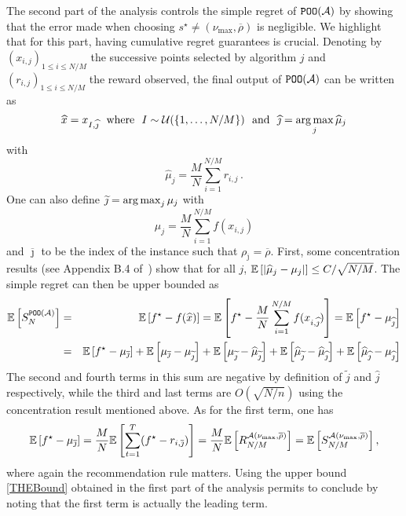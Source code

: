 The second part of the analysis controls the simple regret of $\texttt{POO}(\mathcal{A})$ by showing that the error made when choosing $s^\star \neq (\nu_{\max},\overline{\rho})$ is negligible. We highlight that for this part, having cumulative regret guarantees is crucial. Denoting by $(x_{i,j})_{1\leq i \leq N/M}$ the successive points selected by algorithm $j$ and $(r_{i,j})_{1\leq i \leq N/M}$ the reward observed, the final output of $\texttt{POO}(\mathcal{A})$ can be written as 
\[
    \widehat{x} = x_{I,\widehat\jmath} \ \ \text{where} \ \ I \sim \mathcal{U}(\{1,\dots,N/M\}) \  \text{ and} \ \ \widehat\jmath = \operatorname*{arg\,max}_{j} \widehat{\mu}_j
\] 
with 
\[
    \hat{\mu}_j = \frac{M}{N}\sum_{i=1}^{N/M} r_{i,j}\,.
\]
One can also define $\widetilde\jmath = \operatorname*{arg\,max}_{j} \mu_j$ with 
\[
    \mu_j =\frac{M}{N}\sum_{i=1}^{N/M} f(x_{i,j})
\]
and $\overline{\jmath}$ to be the index of the instance such that $\rho_{\overline{\jmath}} = \overline{\rho}$. First, some concentration results (see Appendix B.4 of~\citealt{grill2015poo}) show that for all $j$, $\mathbb{E}\left[|\widehat{\mu}_{j} - \mu_j|\right] \leq C/\sqrt{N/M}$. The simple regret can then be upper bounded as 
\begin{eqnarray*}
 \mathbb{E}\left[S_N^{\texttt{POO}(\mathcal{A})}\right] & = & \mathbb{E}\left[f^\star - f(\widehat{x})\right] = \mathbb{E}\left[f^\star - \frac{M}{N}\sum_{i=1}^{N/M}f(x_{i,\widehat{\jmath}})\right] = \mathbb{E}\left[f^\star - \mu_{\widehat\jmath}\right]\\
 & = & \mathbb{E}\left[f^\star - \mu_{\overline{\jmath}}\right] + \mathbb{E}\left[\mu_{\overline{\jmath}} - \mu_{\widetilde{\jmath}}\right] + \mathbb{E}\left[\mu_{\widetilde{\jmath}} - \widehat{\mu}_{\widetilde{\jmath}}\right] + \mathbb{E}\left[\widehat{\mu}_{\widetilde{\jmath}}-\widehat{\mu}_{\widehat{\jmath}}\right]
+ \mathbb{E}\left[\widehat{\mu}_{\widehat{\jmath}} - \mu_{\widehat{\jmath}}\right]\end{eqnarray*}
The second and fourth terms in this sum are negative by definition of $\tilde{j}$ and $\hat{j}$ respectively, while the third and last terms are $O(\sqrt{{N}/{n}})$ using the concentration result mentioned above. As for the first term, one has 
\[\mathbb{E}\left[f^\star - \mu_{\overline{\jmath}}\right] = \frac{M}{N}\mathbb{E}\left[\sum_{t=1}^T (f^\star - r_{i,\overline{\jmath}})\right] = \frac{M}{N} \mathbb{E}\left[R_{N/M}^{\mathcal{A}(\nu_{\max},\overline{\rho})}\right] = \mathbb{E}\left[S_{N/M}^{\mathcal{A}(\nu_{\max},\overline{\rho})}\right],\]
where again the recommendation rule matters. Using the upper bound \eqref{THEBound} obtained in the first part of the analysis permits to conclude by noting that the first term is actually the leading term. 
